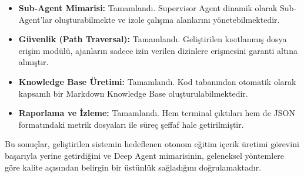 \begin{itemize}
    \item \textbf{Sub-Agent Mimarisi:} \checkmark Tamamlandı. Supervisor Agent dinamik olarak Sub-Agent'lar oluşturabilmekte ve izole çalışma alanlarını yönetebilmektedir.
    \item \textbf{Güvenlik (Path Traversal):} \checkmark Tamamlandı. Geliştirilen kısıtlanmış dosya erişim modülü, ajanların sadece izin verilen dizinlere erişmesini garanti altına almıştır.
    \item \textbf{Knowledge Base Üretimi:} \checkmark Tamamlandı. Kod tabanından otomatik olarak kapsamlı bir Markdown Knowledge Base oluşturulabilmektedir.
    \item \textbf{Raporlama ve İzleme:} \checkmark Tamamlandı. Hem terminal çıktıları hem de JSON formatındaki metrik dosyaları ile süreç şeffaf hale getirilmiştir.
\end{itemize}

Bu sonuçlar, geliştirilen sistemin hedeflenen otonom eğitim içerik üretimi görevini başarıyla yerine getirdiğini ve Deep Agent mimarisinin, geleneksel yöntemlere göre kalite açısından belirgin bir üstünlük sağladığını doğrulamaktadır.
